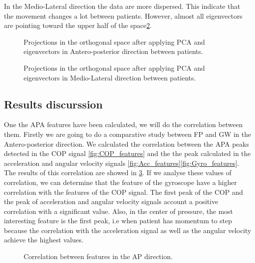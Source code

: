 In the Medio-Lateral direction the data are more dispersed. This indicate that the movement changes a lot between patients. However, almost all eigenvectors are pointing toward the upper half of the space\ref{fig:PCA_ML_patients}.

\begin{figure}[H]
	\centering
	\caption{Projections in the orthogonal space after applying PCA and eigenvectors in Antero-posterior direction between patients.}
	\label{fig:PCA_AP_patients}
\end{figure}

\begin{figure}[H]
	\centering
	\caption{Projections in the orthogonal space after applying PCA and eigenvectors in Medio-Lateral direction between patients.}
	\label{fig:PCA_ML_patients}
\end{figure}


\subsection{Results discurssion}
One the APA features have been calculated, we will do the correlation between them. Firstly we are going to do a comparative study between FP and GW in the Antero-posterior direction. We calculated the correlation between the APA peaks detected in the COP signal \ref{fig:COP_features} and the the peak calculated in the acceleration and angular velocity signals \ref{fig:Acc_features}\ref{fig:Gyro_features}. The results of this correlation are showed in \ref{fig:Corr_AP}. If we analyse these values of correlation, we can determine that the feature of the gyroscope have a higher correlation with the features of the COP signal. The first peak of the COP and the peak of acceleration and angular velocity signals account a positive correlation with a significant value. Also, in the center of pressure, the most interesting feature is the first peak, i.e when patient has momentum to step because the correlation with the acceleration signal as well as the angular velocity achieve the highest values.

\begin{figure}[H]
	\centering
	\caption{Correlation between features in the AP direction.}
	\label{fig:Corr_AP}
\end{figure}

